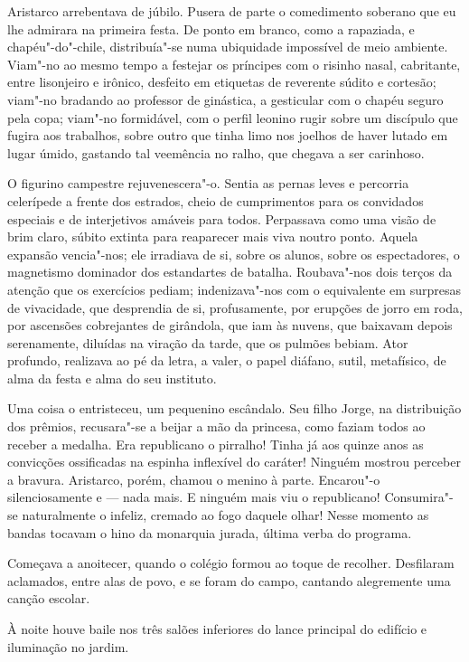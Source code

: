 Aristarco arrebentava de júbilo. Pusera de parte o comedimento soberano que eu
lhe admirara na primeira festa. De ponto em branco, como a rapaziada, e
chapéu"-do"-chile, distribuía"-se numa ubiquidade impossível de meio
ambiente. Viam"-no ao mesmo tempo a festejar os príncipes com o
risinho nasal, cabritante, entre lisonjeiro e irônico, desfeito em
etiquetas de reverente súdito e cortesão; viam"-no bradando ao
professor de ginástica, a gesticular com o chapéu seguro pela copa;
viam"-no formidável, com o perfil leonino rugir sobre um discípulo que
fugira aos trabalhos, sobre outro que tinha limo nos joelhos de haver
lutado em lugar úmido, gastando tal veemência no ralho, que chegava a
ser carinhoso. 

O figurino campestre rejuvenescera"-o. Sentia as pernas
leves e percorria celerípede a frente dos estrados, cheio de
cumprimentos para os convidados especiais e de interjetivos amáveis
para todos. Perpassava como uma visão de brim claro, súbito extinta
para reaparecer mais viva noutro ponto. Aquela expansão vencia"-nos;
ele irradiava de si, sobre os alunos, sobre os espectadores, o
magnetismo dominador dos estandartes de batalha. Roubava"-nos dois
terços da atenção que os exercícios pediam; indenizava"-nos com o
equivalente em surpresas de vivacidade, que desprendia de si,
profusamente, por erupções de jorro em roda, por ascensões cobrejantes
de girândola, que iam às nuvens, que baixavam depois serenamente,
diluídas na viração da tarde, que os pulmões bebiam. Ator profundo,
realizava ao pé da letra, a valer, o papel diáfano, sutil, metafísico,
de alma da festa e alma do seu instituto. 

Uma coisa o entristeceu, um pequenino escândalo. Seu filho Jorge, 
na distribuição dos prêmios, recusara"-se a beijar a mão da princesa, 
como faziam todos ao receber a medalha. Era republicano o pirralho! 
Tinha já aos quinze anos as
convicções ossificadas na espinha inflexível do caráter! Ninguém
mostrou perceber a bravura. Aristarco, porém, chamou o menino à parte.
Encarou"-o silenciosamente e --- nada mais. E ninguém mais viu o
republicano! Consumira"-se naturalmente o infeliz, cremado ao fogo
daquele olhar! Nesse momento as bandas tocavam o hino da monarquia
jurada, última verba do programa. 

Começava a anoitecer, quando o
colégio formou ao toque de recolher. Desfilaram aclamados, entre alas
de povo, e se foram do campo, cantando alegremente uma canção escolar.

À noite houve baile nos três salões inferiores do lance principal do
edifício e iluminação no jardim. 

